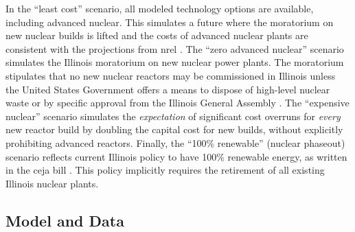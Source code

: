In the ``least cost'' scenario, all modeled technology options are available,
including advanced nuclear. This simulates a future where the moratorium on
new nuclear builds is lifted and the costs of advanced nuclear plants are
consistent with the projections from \gls{nrel} \cite{nrel_2020_2020}.
The ``zero advanced nuclear'' scenario simulates the Illinois moratorium on new nuclear
power plants. The moratorium stipulates that no new nuclear reactors may be
commissioned in Illinois unless the United States Government offers a means to
dispose of high-level nuclear waste or by specific approval from the Illinois
General Assembly \cite{shea_states_2021}. The ``expensive nuclear'' scenario
simulates the \textit{expectation} of significant cost overruns for \textit{every}
new reactor build by doubling the capital cost for new builds, without explicitly
prohibiting advanced reactors. Finally, the ``100\% renewable'' (nuclear phaseout)
scenario reflects current Illinois policy to have 100\% renewable energy, as
written in the \gls{ceja} bill \cite{harmon_climate_2021}. This policy implicitly
requires the retirement of all existing Illinois nuclear plants.

\begin{table}[H]
  \centering
  \caption{Summary of Illinois Case Study Scenarios}
  \label{tab:il-scenarios}
\end{table}

\subsection{Model and Data}


